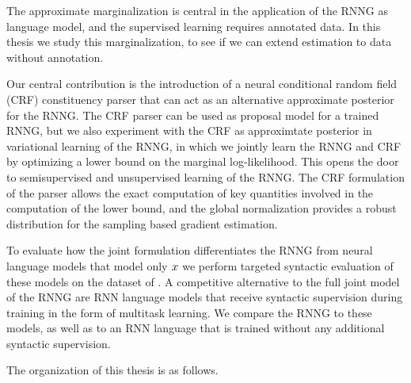 The approximate marginalization is central in the application of the RNNG as language model, and the supervised learning requires annotated data. In this thesis we study this marginalization, to see if we can extend estimation to data without annotation.

Our central contribution is the introduction of a neural conditional random field (CRF) constituency parser that can act as an alternative approximate posterior for the RNNG. The CRF parser can be used as proposal model for a trained RNNG, but we also experiment with the CRF as approximtate posterior in variational learning of the RNNG, in which we jointly learn the RNNG and CRF by optimizing a lower bound on the marginal log-likelihood. This opens the door to semisupervised and unsupervised learning of the RNNG. The CRF formulation of the parser allows the exact computation of key quantities involved in the computation of the lower bound, and the global normalization provides a robust distribution for the sampling based gradient estimation.

To evaluate how the joint formulation differentiates the RNNG from neural language models that model only $x$ we perform targeted syntactic evaluation of these models on the dataset of \citep{linzen2018targeted}. A competitive alternative to the full joint model of the RNNG are RNN language models that receive syntactic supervision during training in the form of multitask learning. We compare the RNNG to these models, as well as to an RNN language that is trained without any additional syntactic supervision.

The organization of this thesis is as follows.


